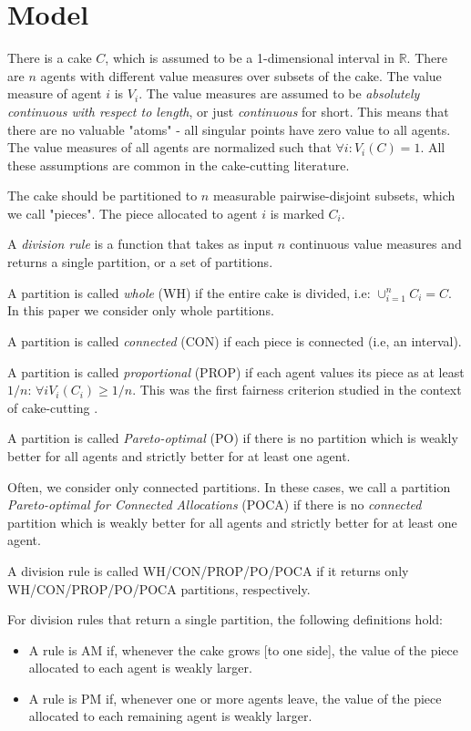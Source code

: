 \documentclass[a4paper,12pt]{article}
\begin{document}
\iffalse
\section{Model}
There is a cake $C$, which is assumed to be a 1-dimensional interval in $\mathbb{R}$. There are $n$ agents with different value measures over subsets of the cake. The value measure of agent $i$ is $V_i$. The value measures are assumed to be \emph{absolutely continuous with respect to length}, or just \emph{continuous} for short. This means that there are no valuable "atoms" - all singular points have zero value to all agents. The value measures of all agents are normalized such that $\forall i: V_i(C)=1$.
All these assumptions are common in the cake-cutting literature.

The cake should be partitioned to $n$ measurable pairwise-disjoint subsets, which we call "pieces". The piece allocated to agent $i$ is marked $C_i$.

A \emph{division rule} is a function that takes as input $n$ continuous value measures and returns a single partition, or a set of partitions.

A partition is called \emph{whole} (WH) if the entire cake is divided, i.e: $\cup_{i=1}^{n}{C_i}=C$. In this paper we consider only whole partitions.

A partition is called \emph{connected} (CON) if each piece is connected (i.e, an interval).

A partition is called \emph{proportional} (PROP) if each agent values its piece as at least $1/n$: $\forall i V_i(C_i)\geq 1/n$. This was the first fairness criterion studied in the context of cake-cutting \cite{Steinhaus1948Problem}.

A partition is called \emph{Pareto-optimal} (PO) if there is no partition which is weakly better for all agents and strictly better for at least one agent.

Often, we consider only connected partitions. In these cases, we call a partition \emph{Pareto-optimal for Connected Allocations} (POCA) if there is no \emph{connected} partition which is weakly better for all agents and strictly better for at least one agent.

A division rule is called WH/CON/PROP/PO/POCA if it returns only WH/CON/PROP/PO/POCA partitions, respectively.

For division rules that return a single partition, the following definitions hold:
\begin{itemize}
\item{A rule is AM if, whenever the cake grows [to one side], the value of the piece allocated to each agent is weakly larger.}
\item{A rule is PM if, whenever one or more agents leave, the value of the piece allocated to each remaining agent is weakly larger.}
\end{itemize}
\end{document}
